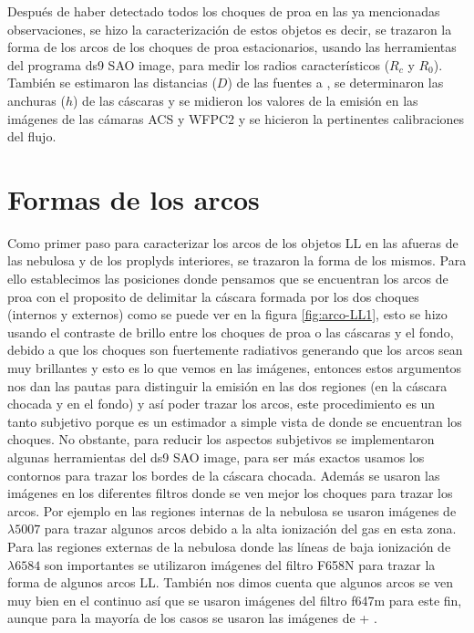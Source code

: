Después de haber detectado todos los choques de proa en las ya mencionadas observaciones, se hizo la caracterización de estos objetos es decir, se trazaron la forma de los arcos de los choques de proa estacionarios, usando las herramientas del programa ds9 SAO image,  para medir los radios característicos (\(R_{c}\) y \( R_{0}\)). También se estimaron las distancias (\(D\)) de las fuentes a \thC{}, se determinaron las anchuras (\(h\)) de las cáscaras y se  midieron  los valores de la emisión en las imágenes de las cámaras ACS y WFPC2 y se hicieron la pertinentes calibraciones del flujo.

\section{Formas de los arcos}
\label{sec:arcos}

Como primer paso para caracterizar los arcos de los objetos LL en las afueras de las nebulosa y de los proplyds interiores, se trazaron la forma de los mismos. Para ello establecimos las posiciones donde pensamos que se encuentran los arcos de proa con el proposito de delimitar la cáscara formada por los dos choques (internos y externos) como se puede ver en la figura \ref{fig:arco-LL1}, esto se hizo usando el contraste de brillo entre los choques de proa o las cáscaras y el fondo, debido a que los choques son fuertemente radiativos generando que los arcos sean muy brillantes y esto es lo que vemos en las imágenes, entonces estos argumentos nos dan las pautas para distinguir la emisión en las dos regiones (en la cáscara chocada y en el fondo) y así poder trazar los arcos, este procedimiento es un tanto subjetivo porque es un estimador a simple vista de donde se encuentran los choques. No obstante, para reducir los aspectos subjetivos se implementaron algunas herramientas del ds9 SAO image, para ser más exactos usamos los contornos para trazar los bordes de la cáscara chocada. Además se usaron las imágenes en los diferentes filtros donde se ven mejor los choques para trazar los arcos. Por ejemplo en las regiones internas de la nebulosa se usaron imágenes de \oiii{}~\(\lambda5007\) para trazar algunos arcos debido a la alta ionización del gas en esta zona. Para las regiones externas de la nebulosa donde las líneas de baja ionización de \nii{}~\(\lambda6584\) son importantes se utilizaron imágenes del filtro F658N para trazar la forma de algunos arcos LL. También nos dimos cuenta que algunos arcos se ven muy bien en el continuo así que se usaron imágenes del filtro f647m para este fin, aunque para la mayoría de los casos se usaron las imágenes de \ha{} + \nii{}.\\

